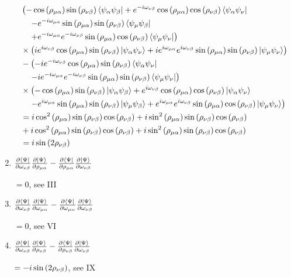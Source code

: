 \documentclass{aux/ttuthes2007}
\newcommand{\bra}[1]{\ensuremath{\left\langle#1\right\vert}}
\newcommand{\ket}[1]{\ensuremath{\left|#1\right\rangle}}
\newcommand{\s}[1]{\sin\left( #1 \right)}
\newcommand{\ssq}[1]{\sin^2\left( #1 \right)}
\newcommand{\co}[1]{\cos\left( #1 \right)}
\newcommand{\cosq}[1]{\cos^2\left( #1 \right)}
\newcommand{\kpp}[1]{\frac{\partial \ket\Psi}{\partial #1}}
\newcommand{\bpp}[1]{\frac{\partial \bra\Psi}{\partial #1}}
\newcommand{\ind}[1]{{\uo #1 \oo #1}}
\newcommand{\uo}[1]{
		\IfEqCase{#1}{
			{0}{\mu}
			{1}{\nu}
			{2}{\xi}
		}[\PackageError{uo}{Undefined option to uo: #1}{}]
}
\newcommand{\oo}[1]{
		\IfEqCase{#1}{
			{0}{\alpha}
			{1}{\beta}
			{2}{\gamma}
		}[\PackageError{unocorb}{Undefined option to unuo: #1}{}]
}
\begin{document}
\begin{enumerate}
\begin{align*}
	&\left (
	-\co {\rho_\ind 0}\s {\rho_\ind 1}\bra {\psi_{\oo 0}\psi_{\oo 1}}
	+ e^{ -i \omega_\ind 1}\co {\rho_\ind 0 }\co {\rho_\ind 1}\bra {\psi_{\oo 0}\psi_{\uo 1}}
	\right .
	\\
	&\left .
	\quad - e^{ -i \omega_\ind 0}\s {\rho_\ind 0}\s {\rho_\ind 1}\bra{\psi_{\uo 0} \psi_{\oo 1}} 
	\right .
	\\
	&\left . \quad
	+ e^{ -i \omega_\ind 0}e^{ -i \omega_\ind 1}\s {\rho_\ind 0}\co {\rho_\ind 1}\bra{\psi_{\uo 0} \psi_{\uo 1}} 
	\right )
	\\
	&\times\left (
	ie^{i\omega_\ind 1}\co {\rho_\ind 0 }\s {\rho_\ind 1}\ket {\psi_{\oo 0}\psi_{\uo 1}} 
	+ ie^{i\omega_\ind 0}e^{i\omega_\ind 1}\s {\rho_\ind 0}\s {\rho_\ind 1}\ket{\psi_{\uo 0} \psi_{\uo 1}} 
	\right )
	\\
	&-\left (
	-i e^{ -i \omega_\ind 1}\co {\rho_\ind 0 }\s {\rho_\ind 1}\bra {\psi_{\oo 0}\psi_{\uo 1}}
	\right .
	\\
	&\left . \quad
	-i e^{ -i \omega_\ind 0}e^{ -i \omega_\ind 1}\s {\rho_\ind 0}\s {\rho_\ind 1}\bra{\psi_{\uo 0} \psi_{\uo 1}} 
	\right )
	\\
	&\times\left (
	-\co {\rho_\ind 0}\s {\rho_\ind 1}\ket {\psi_{\oo 0}\psi_{\oo 1}}
	+ e^{i\omega_\ind 1}\co {\rho_\ind 0 }\co {\rho_\ind 1}\ket {\psi_{\oo 0}\psi_{\uo 1}}
	\right .
	\\
	&\left .
	\quad - e^{i\omega_\ind 0}\s {\rho_\ind 0}\s {\rho_\ind 1}\ket{\psi_{\uo 0} \psi_{\oo 1}} 
	+ e^{i\omega_\ind 0}e^{i\omega_\ind 1}\s {\rho_\ind 0}\co {\rho_\ind 1}\ket{\psi_{\uo 0} \psi_{\uo 1}} 
	\right )
	\\
	&= 
	i\cosq {\rho_\ind 0}\s {\rho_\ind 1}\co {\rho_\ind 1}
	+i\ssq {\rho_\ind 0}\s {\rho_\ind 1}\co {\rho_\ind 1}
	\\
	&+i\cosq {\rho_\ind 0}\s {\rho_\ind 1}\co {\rho_\ind 1}
	+ i\ssq  {\rho_\ind 0}\s {\rho_\ind 1}\co {\rho_\ind 1}
	\\
	&= i\s {2\rho_\ind 1}
\end{align*}

	\item $ \bpp{\omega_\ind 1} \kpp{\rho_\ind 0}
	- \bpp{\rho_\ind 0} \kpp{\omega_\ind 1}$

	$= 0$, see III

	\item $ \bpp{\omega_\ind 1} \kpp{\omega_\ind 0}
	- \bpp{\omega_\ind 0} \kpp{\omega_\ind 1}$

	$= 0$, see VI

	\item $ \bpp{\omega_\ind 1} \kpp{\rho_\ind 1}
	- \bpp{\rho_\ind 1} \kpp{\omega_\ind 1}$

	$= -i\s {2\rho_\ind 1}$, see IX
\end{enumerate}
\end{document}
